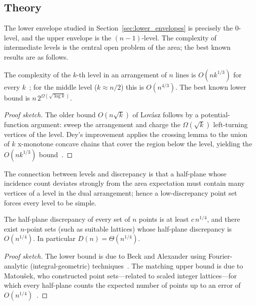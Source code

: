 \subsection{Theory}

The lower envelope studied in Section~\ref{sec:lower_envelopes} is precisely
the $0$-level, and the upper envelope is the $(n-1)$-level. The complexity of
intermediate levels is the central open problem of the area; the best known
results are as follows.

\begin{theorem}\label{thm:level_complexity}
The complexity of the $k$-th level in an arrangement of $n$ lines is
$O(n k^{1/3})$ for every $k$~\cite{dey1998}; for the middle level ($k \approx
n/2$) this is $O(n^{4/3})$. The best known lower bound is
$n\,2^{\Omega(\sqrt{\log k})}$.
\end{theorem}
\begin{proof}[Proof sketch]
The older bound $O(n \sqrt{k})$ of Lov\'asz follows by a potential-function
argument: sweep the arrangement and charge the $\Omega(\sqrt{k})$ left-turning
vertices of the level. Dey's improvement applies the crossing lemma to the
union of $k$ x-monotone concave chains that cover the region below the level,
yielding the $O(nk^{1/3})$ bound~\cite{dey1998}.
\end{proof}

The connection between levels and discrepancy is that a half-plane whose
incidence count deviates strongly from the area expectation must contain many
vertices of a level in the dual arrangement; hence a low-discrepancy point set
forces every level to be simple.

\begin{theorem}\label{thm:halfplane_discrepancy}
The half-plane discrepancy of every set of $n$ points is at least
$c\,n^{1/4}$, and there exist $n$-point sets (such as suitable lattices) whose
half-plane discrepancy is $O(n^{1/4})$. In particular $D(n) = \Theta(n^{1/4})$.
\end{theorem}
\begin{proof}[Proof sketch]
The lower bound is due to Beck and Alexander using Fourier-analytic
(integral-geometric) techniques~\cite{matousek1999}. The matching upper bound
is due to Matou\v{s}ek, who constructed point sets---related to scaled integer
lattices---for which every half-plane counts the expected number of points up
to an error of $O(n^{1/4})$~\cite{matousek1995,matousek1999}.
\end{proof}

